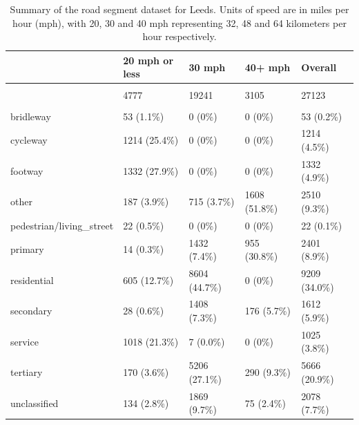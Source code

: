 \documentclass[
]{article}
\begin{document}
\begin{table}

\caption{\label{tab:t1}Summary of the road segment dataset for Leeds. Units of speed are in miles per hour (mph), with 20, 30 and 40 mph representing 32, 48 and 64 kilometers per hour respectively.}
\centering
\begin{tabular}[t]{lllll}
\toprule
 & 20 mph or less & 30 mph & 40+ mph & Overall\\
\midrule
\addlinespace[0.3em]
\multicolumn{5}{l}{\textbf{N. observations}}\\
\hspace{1em} & 4777 & 19241 & 3105 & 27123\\
\addlinespace[0.3em]
\multicolumn{5}{l}{\textbf{Highway type}}\\
\hspace{1em}\hspace{1em}bridleway & 53 (1.1\%) & 0 (0\%) & 0 (0\%) & 53 (0.2\%)\\
\hspace{1em}cycleway & 1214 (25.4\%) & 0 (0\%) & 0 (0\%) & 1214 (4.5\%)\\
\hspace{1em}footway & 1332 (27.9\%) & 0 (0\%) & 0 (0\%) & 1332 (4.9\%)\\
\hspace{1em}other & 187 (3.9\%) & 715 (3.7\%) & 1608 (51.8\%) & 2510 (9.3\%)\\
\hspace{1em}pedestrian/living\_street & 22 (0.5\%) & 0 (0\%) & 0 (0\%) & 22 (0.1\%)\\
\hspace{1em}primary & 14 (0.3\%) & 1432 (7.4\%) & 955 (30.8\%) & 2401 (8.9\%)\\
\hspace{1em}residential & 605 (12.7\%) & 8604 (44.7\%) & 0 (0\%) & 9209 (34.0\%)\\
\hspace{1em}secondary & 28 (0.6\%) & 1408 (7.3\%) & 176 (5.7\%) & 1612 (5.9\%)\\
\hspace{1em}service & 1018 (21.3\%) & 7 (0.0\%) & 0 (0\%) & 1025 (3.8\%)\\
\hspace{1em}tertiary & 170 (3.6\%) & 5206 (27.1\%) & 290 (9.3\%) & 5666 (20.9\%)\\
\hspace{1em}unclassified & 134 (2.8\%) & 1869 (9.7\%) & 75 (2.4\%) & 2078 (7.7\%)\\

\end{tabular}
\end{table}
\end{document}
